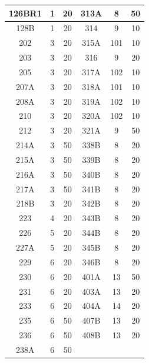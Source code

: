 \begin{table}[p]
\begin{tabular}{|c|c|c||c|c|c|}
126BR1  &   1      &  20              & 313A    &   8      &  50           \\ \hline
128B    &   1      &  20              & 314     &   9      &  10           \\ \hline
202     &   3      &  20              & 315A    &   101    &  10           \\ \hline
203     &   3      &  20              & 316     &   9      &  20           \\ \hline
205     &   3      &  20              & 317A    &   102    &  10           \\ \hline
207A    &   3      &  20              & 318A    &   101    &  10           \\ \hline
208A    &   3      &  20              & 319A    &   102    &  10           \\ \hline
210     &   3      &  20              & 320A    &   102    &  10           \\ \hline
212     &   3      &  20              & 321A    &   9      &  50           \\ \hline
214A    &   3      &  50              & 338B    &   8      &  20           \\ \hline
215A    &   3      &  50              & 339B    &   8      &  20           \\ \hline
216A    &   3      &  50              & 340B    &   8      &  20           \\ \hline
217A    &   3      &  50              & 341B    &   8      &  20           \\ \hline
218B    &   3      &  20              & 342B    &   8      &  20           \\ \hline
223     &   4      &  20              & 343B    &   8      &  20           \\ \hline
226     &   5      &  20              & 344B    &   8      &  20           \\ \hline
227A    &   5      &  20              & 345B    &   8      &  20           \\ \hline
229     &   6      &  20              & 346B    &   8      &  20           \\ \hline
230     &   6      &  20              & 401A    &   13     &  50           \\ \hline
231     &   6      &  20              & 403A    &   13     &  20           \\ \hline
233     &   6      &  20              & 404A    &   14     &  20           \\ \hline
235     &   6      &  50              & 407B    &   13     &  20           \\ \hline
236     &   6      &  50              & 408B    &   13     &  20           \\ \hline
238A    &   6      &  50     & \multicolumn{3}{c|}{ \hspace{.1in}}            \\ \hline
\end{tabular}
\label{tab:Memorial_Test_Matrix_Transverse}
\end{table}


